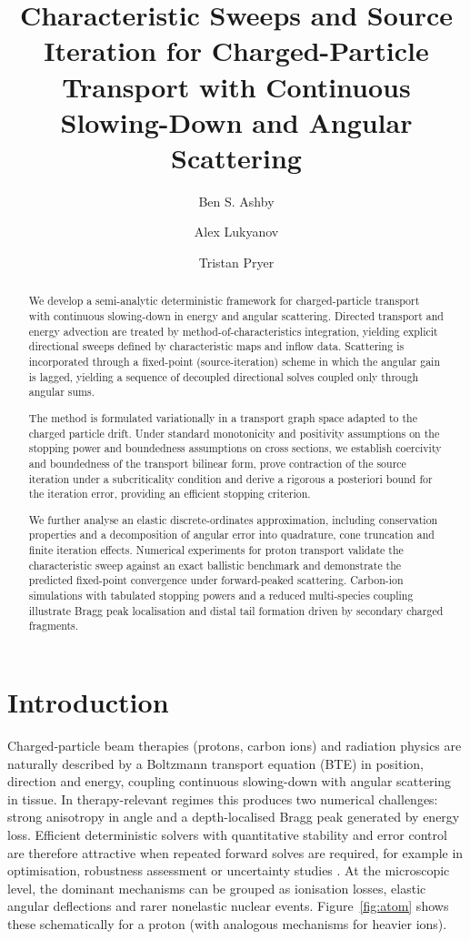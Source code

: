 \documentclass[final]{amsart}
\title{Characteristic Sweeps and Source Iteration for Charged-Particle Transport with Continuous Slowing-Down and Angular Scattering}
\author[1]{Ben S. Ashby}
\author[3]{Alex Lukyanov}
\author[1,2]{Tristan Pryer}
\begin{document}
\begin{abstract}
  We develop a semi-analytic deterministic framework for
  charged-particle transport with continuous slowing-down in energy
  and angular scattering. Directed transport and energy advection are
  treated by method-of-characteristics integration, yielding explicit
  directional sweeps defined by characteristic maps and inflow
  data. Scattering is incorporated through a fixed-point
  (source-iteration) scheme in which the angular gain is lagged,
  yielding a sequence of decoupled directional solves coupled only
  through angular sums.

  The method is formulated variationally in a transport graph space
  adapted to the charged particle drift. Under standard monotonicity
  and positivity assumptions on the stopping power and boundedness
  assumptions on cross sections, we establish coercivity and
  boundedness of the transport bilinear form, prove contraction of the
  source iteration under a subcriticality condition and derive a
  rigorous a posteriori bound for the iteration error, providing an
  efficient stopping criterion.

  We further analyse an elastic discrete-ordinates approximation,
  including conservation properties and a decomposition of angular
  error into quadrature, cone truncation and finite iteration
  effects. Numerical experiments for proton transport validate the
  characteristic sweep against an exact ballistic benchmark and
  demonstrate the predicted fixed-point convergence under
  forward-peaked scattering. Carbon-ion simulations with tabulated
  stopping powers and a reduced multi-species coupling illustrate
  Bragg peak localisation and distal tail formation driven by
  secondary charged fragments.
\end{abstract}

\maketitle

\section{Introduction}

Charged-particle beam therapies (protons, carbon ions) and radiation
physics are naturally described by a Boltzmann transport equation
(BTE) in position, direction and energy, coupling continuous
slowing-down with angular scattering in tissue. In therapy-relevant
regimes this produces two numerical challenges: strong anisotropy in
angle and a depth-localised Bragg peak generated by energy
loss. Efficient deterministic solvers with quantitative stability and
error control are therefore attractive when repeated forward solves
are required, for example in optimisation, robustness assessment or
uncertainty studies \cite{stammer2024deterministic,yu2025review}.  At
the microscopic level, the dominant mechanisms can be grouped as
ionisation losses, elastic angular deflections and rarer nonelastic
nuclear events. Figure~\ref{fig:atom} shows these schematically for a
proton (with analogous mechanisms for heavier ions).
\end{document}
